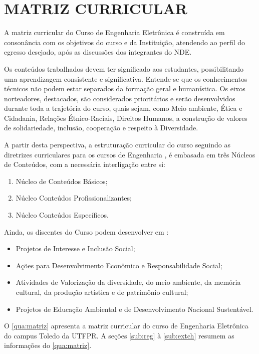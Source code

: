 \section{MATRIZ CURRICULAR}

A matriz curricular do Curso de Engenharia Eletrônica é construída em consonância com os objetivos do curso e da Instituição, atendendo ao perfil do egresso desejado, após as discussões dos integrantes do NDE.

Os conteúdos trabalhados devem ter significado aos estudantes, possibilitando uma aprendizagem consistente e significativa. Entende-se que os conhecimentos técnicos não podem estar separados da formação geral e humanística. Os eixos norteadores, destacados, são considerados prioritários e serão desenvolvidos durante toda a trajetória do curso, quais sejam, como Meio ambiente, Ética e Cidadania, Relações Étnico-Raciais, Direitos Humanos, a construção de valores de solidariedade, inclusão, cooperação e respeito à Diversidade.

A partir desta perspectiva, a estruturação curricular do curso seguindo as diretrizes curriculares para os cursos de Engenharia \cite{dcneng}, é embasada em três Núcleos de Conteúdos, com a necessária interligação entre si:

\begin{enumerate}
	\item 	Núcleo de Conteúdos Básicos;
	\item 	Núcleo Conteúdos Profissionalizantes;
	\item 	Núcleo Conteúdos Específicos.
\end{enumerate}

Ainda, os discentes do Curso podem desenvolver em :

\begin{itemize}
	\item 	Projetos de Interesse e Inclusão Social;
	\item	Ações para Desenvolvimento Econômico e Responsabilidade Social;
	\item	Atividades de Valorização da diversidade, do meio ambiente, da memória cultural, da produção artística e de patrimônio cultural;
	\item	Projetos de Educação Ambiental e de Desenvolvimento Nacional Sustentável.
\end{itemize}

O \autoref{qua:matriz} apresenta a matriz curricular do curso de Engenharia Eletrônica do campus Toledo da UTFPR.  A seções \ref{sub:reg} à \ref{sub:extch} resumem as informações do \autoref{qua:matriz}. 


